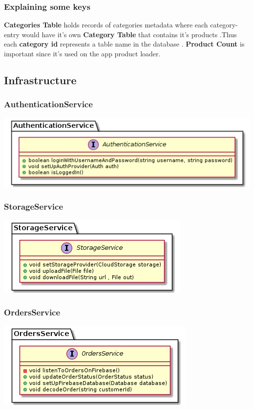 \documentclass{article}
\begin{document}
\subsubsection{Explaining some keys}
\textbf{Categories Table } holds records of categories metadata where each category-entry would have it's own \textbf{Category Table} that contains it's products .Thus each \textbf{category id} represents a table name in the database .\newline
\textbf{Product Count} is important since it's used on the app product loader.

\subsection{Infrastructure}
\subsubsection{AuthenticationService}
\includegraphics[scale=0.75]{./out/NodeApp/AuthenticationService/AuthService.png}

\subsubsection{StorageService}
\includegraphics[scale=0.75]{./out/NodeApp/StorageService/StorageService.png}

\subsubsection{OrdersService}
\includegraphics[scale=1]{./out/NodeApp/OrdersService/OrdersService.png}
\end{document}
